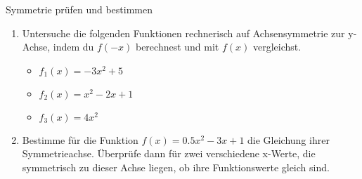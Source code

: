 \begin{aufgabenumgebung}{Symmetrie prüfen und bestimmen}
\begin{enumerate}
    \item Untersuche die folgenden Funktionen rechnerisch auf Achsensymmetrie zur y-Achse, indem du $f(-x)$ berechnest und mit $f(x)$ vergleichst.
        \begin{itemize}
            \item $f_1(x) = -3x^2 + 5$
            \item $f_2(x) = x^2 - 2x + 1$
            \item $f_3(x) = 4x^2$
        \end{itemize}
    \item Bestimme für die Funktion $f(x) = 0.5x^2 - 3x + 1$ die Gleichung ihrer Symmetrieachse. Überprüfe dann für zwei verschiedene x-Werte, die symmetrisch zu dieser Achse liegen, ob ihre Funktionswerte gleich sind.
\end{enumerate}
\end{aufgabenumgebung}


